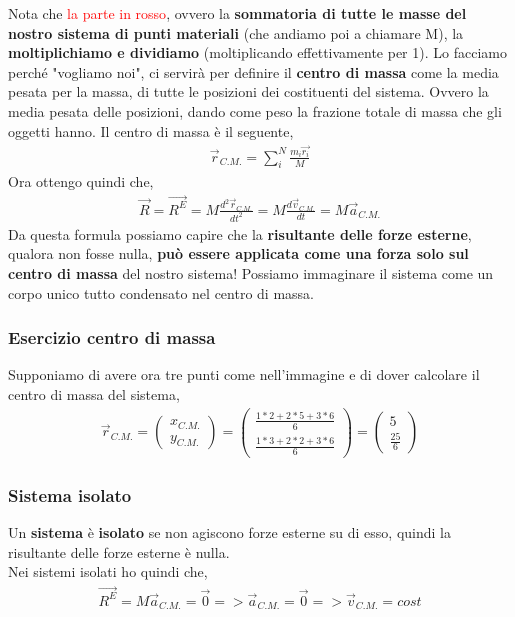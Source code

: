         Nota che \textcolor{Red}{la parte in rosso}, ovvero la \textbf{sommatoria di tutte le masse del nostro sistema di punti materiali} (che andiamo poi a chiamare M), la \textbf{moltiplichiamo e dividiamo} (moltiplicando effettivamente per 1). Lo facciamo perché "vogliamo noi", ci servirà per definire il \textbf{centro di massa} come la media pesata per la massa, di tutte le posizioni dei costituenti del sistema. Ovvero la media pesata delle posizioni, dando come peso la frazione totale di massa che gli oggetti hanno. Il centro di massa è il seguente,
        \begin{align*}
            \vec{r}_{C.M.}=\sum_i^N \frac{m_i\vec{r_i}}{M}
        \end{align*}
        Ora ottengo quindi che,
        \begin{align*}
            \vec{R}=\vec{R^E}=M\frac{d^2\vec{r}_{C.M.}}{dt^2}=M\frac{d\vec{v}_{C.M.}}{dt}=M\vec{a}_{C.M.}
        \end{align*}
        Da questa formula possiamo capire che la \textbf{risultante delle forze esterne}, qualora non fosse nulla, \textbf{può essere applicata come una forza solo sul centro di massa} del nostro sistema! Possiamo immaginare il sistema come un corpo unico tutto condensato nel centro di massa.

        \subsubsection{Esercizio centro di massa}
        Supponiamo di avere ora tre punti come nell'immagine e di dover calcolare il centro di massa del sistema,
        \begin{align*}
            \vec{r}_{C.M.}=
            \left(\begin{array}{c}x_{C.M.} \\y_{C.M.}\end{array} \right)=
            \left(\begin{array}{c}\frac{1*2+2*5+3*6}{6} \\\frac{1*3+2*2+3*6}{6}\end{array} \right)= \left(\begin{array}{c}5 \\\frac{25}{6}\end{array} \right)
        \end{align*}

        \subsubsection{Sistema isolato}
            Un \textbf{sistema} è \textbf{isolato} se non agiscono forze esterne su di esso, quindi la risultante delle forze esterne è nulla.\\
            Nei sistemi isolati ho quindi che,
            \begin{align*}
                \vec{R^E}=M\vec{a}_{C.M.}=\vec{0} => \vec{a}_{C.M.}=\vec{0} =>\vec{v}_{C.M.}=cost
            \end{align*}

